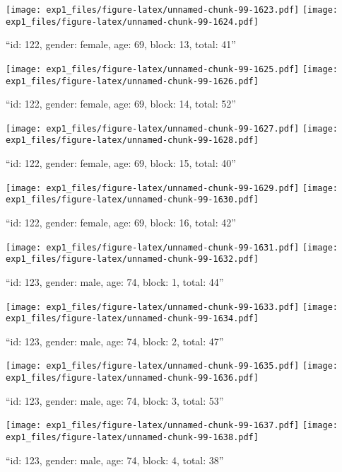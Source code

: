 \documentclass[,]{article}
\begin{document}
\texttt{[image: exp1\_files/figure-latex/unnamed-chunk-99-1623.pdf]}
\texttt{[image: exp1\_files/figure-latex/unnamed-chunk-99-1624.pdf]}

\newpage
[1] 

``id: 122, gender: female, age: 69, block: 13, total: 41''

\texttt{[image: exp1\_files/figure-latex/unnamed-chunk-99-1625.pdf]}
\texttt{[image: exp1\_files/figure-latex/unnamed-chunk-99-1626.pdf]}

\newpage
[1] 

``id: 122, gender: female, age: 69, block: 14, total: 52''

\texttt{[image: exp1\_files/figure-latex/unnamed-chunk-99-1627.pdf]}
\texttt{[image: exp1\_files/figure-latex/unnamed-chunk-99-1628.pdf]}

\newpage
[1] 

``id: 122, gender: female, age: 69, block: 15, total: 40''

\texttt{[image: exp1\_files/figure-latex/unnamed-chunk-99-1629.pdf]}
\texttt{[image: exp1\_files/figure-latex/unnamed-chunk-99-1630.pdf]}

\newpage
[1] 

``id: 122, gender: female, age: 69, block: 16, total: 42''

\texttt{[image: exp1\_files/figure-latex/unnamed-chunk-99-1631.pdf]}
\texttt{[image: exp1\_files/figure-latex/unnamed-chunk-99-1632.pdf]}

\newpage
[1] 

``id: 123, gender: male, age: 74, block: 1, total: 44''

\texttt{[image: exp1\_files/figure-latex/unnamed-chunk-99-1633.pdf]}
\texttt{[image: exp1\_files/figure-latex/unnamed-chunk-99-1634.pdf]}

\newpage
[1] 

``id: 123, gender: male, age: 74, block: 2, total: 47''

\texttt{[image: exp1\_files/figure-latex/unnamed-chunk-99-1635.pdf]}
\texttt{[image: exp1\_files/figure-latex/unnamed-chunk-99-1636.pdf]}

\newpage
[1] 

``id: 123, gender: male, age: 74, block: 3, total: 53''

\texttt{[image: exp1\_files/figure-latex/unnamed-chunk-99-1637.pdf]}
\texttt{[image: exp1\_files/figure-latex/unnamed-chunk-99-1638.pdf]}

\newpage
[1] 

``id: 123, gender: male, age: 74, block: 4, total: 38''
\end{document}
